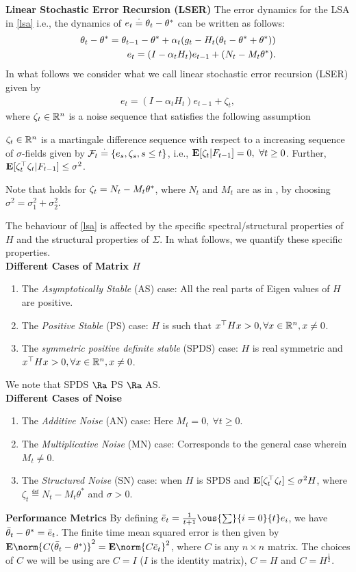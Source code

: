 \textbf{Linear Stochastic Error Recursion (LSER)} The error dynamics for the LSA in \eqref{lsa} i.e., the dynamics of $e_t\stackrel{\cdot}{=}\theta_t-\theta^*$ can be written as follows:
\begin{align}\label{errprelim}
\theta_t-\theta^*=\theta_{t-1}-\theta^*+\alpha_t(g_t -H_t(\theta_t-\theta^*+\theta^*))\nonumber\\
e_t=(I-\alpha_t H_t)e_{t-1}+(N_t-M_t\theta^*).
\end{align}
In what follows we consider what we call linear stochastic error recursion (LSER) given by
\begin{align}\label{lsergen}
e_t=(I-\alpha_t H_t)e_{t-1}+\zeta_t,
\end{align}
where $\zeta_t\in \mathbb{R}^n$ is a noise sequence that satisfies the following assumption
\begin{assumption}\label{zetaassmp}
$\zeta_t\in \mathbb{R}^{n}$ is a martingale difference sequence with respect to a increasing sequence of $\sigma$-fields given by $\mathcal{F}_t\stackrel{\cdot}{=} \{e_s, \zeta_s,s\leq t\}$, i.e., $\mathbf{E}[\zeta_t|F_{t-1}]=0,~\forall t\geq 0$. Further, $\mathbf{E}[\zeta_t^\top \zeta_t|F_{t-1}]\leq \sigma^2$.
\end{assumption}
Note that  holds for $\zeta_t=N_t-M_t\theta^*$, where $N_t$ and $M_t$ are as in , by choosing $\sigma^2=\sigma_1^2+\sigma_2^2$.\par

The behaviour of \eqref{lsa} is affected by the specific spectral/structural properties of $H$ and the structural properties of $\Sigma$.
In what follows, we quantify these specific properties.\\
\textbf{Different Cases of Matrix $H$}
\begin{enumerate}[label=(\roman*)]
\item The \emph{Asymptotically Stable} (AS) case: All the real parts of Eigen values of $H$ are positive.
\item The \emph{Positive Stable} (PS) case: $H$ is such that $x^\top H x>0, \forall x\in \mathbb{R}^n,x\neq 0$.
\item The \emph{symmetric positive definite stable} (SPDS) case: $H$ is real symmetric and $x^\top Hx>0, \forall x\in \mathbb{R}^n, x\neq 0$.
\end{enumerate}
We note that SPDS $\Ra$ PS $\Ra$ AS.\\
\textbf{Different Cases of Noise}
\begin{enumerate}[label=(\roman*)]
\item The \emph{Additive Noise} (AN) case: Here $M_t=0, ~\forall t\geq 0$.
\item The \emph{Multiplicative Noise} (MN) case: Corresponds to the general case wherein $M_t\neq 0$.
\item The \emph{Structured Noise} (SN) case: when $H$ is SPDS and $\mathbf{E}[\zeta_t^\top \zeta_t]\leq \sigma^2 H$, where $\zeta_t\eqdef N_t-M_t\theta^*$ and $\sigma>0$.
\end{enumerate}
\textbf{Performance Metrics} By defining $\eb_t=\frac{1}{t+1}\ous{\sum}{i=0}{t} e_i$, we have $\bar{\theta}_t-\theta^*=\bar{e}_t$. The finite time mean squared error is then given by $\E\norm{C(\tb_t-\ts)}^2=\E\norm{C\eb_t}^2$, where $C$ is any $n\times n$ matrix. The choices of $C$ we will be using are $C=I$ ($I$ is the identity matrix), $C=H$ and $C=H^{\frac{1}{2}}$.

